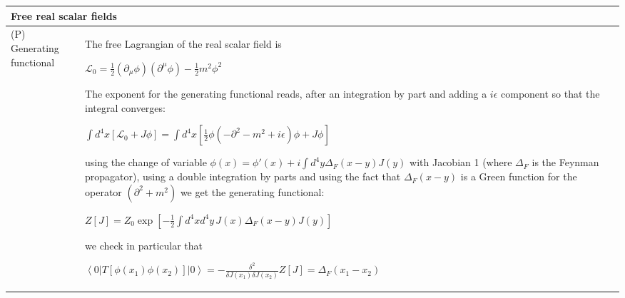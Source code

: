 \documentclass[11pt,amsmath,amssymb,latexsym]{article}
\newcommand{\toshTableBegin} 			{\begin{tabular}{|p{5cm}|p{11cm}|}}
\newcommand{\toshTableEnd} 				{\hline \end{tabular}}
\newcommand{\toshTableTitle}[1] 	{\hline \multicolumn{2}{|l|}{{\bf{#1}}}\\ \hline}
\newcommand{\toshProperty}[2]			{\hline (P) {#1} & {#2} \\}
\newcommand{\toshL}							{{\mathcal{L}}}
\newcommand{\bra}[1]{\left<{#1}\right|}
\newcommand{\ket}[1]{\left|{#1}\right>}
\begin{document}

\toshTableBegin
\toshTableTitle{Free real scalar fields}
\toshProperty{Generating functional}{The free Lagrangian of the real scalar field is 

\quad $\displaystyle \toshL_0 = \frac{1}{2}(\partial_\mu\phi)(\partial^\mu\phi) - \frac{1}{2}m^2\phi^2$

The exponent for the generating functional reads, after an integration by part and adding a $i\epsilon$ component so that the integral converges:

\quad $\displaystyle \int d^4 x [\toshL_0 + J\phi] = \int d^4 x\left[\frac{1}{2}\phi(-\partial^2- m^2 + i\epsilon)\phi + J\phi\right]$

using the change of variable $\phi(x)=\phi'(x)+ i\int d^4 y \Delta_F(x-y)J(y)$ with Jacobian 1 (where $\Delta_F$ is the Feynman propagator), using a double integration by parts and using the fact that $\Delta_F(x-y)$ is a Green function for the operator $(\partial^2+m^2)$ we get the generating functional:

\smallskip

\quad $\displaystyle Z[J] = Z_0 \exp\left[ -\frac{1}{2} \int d^4 x d^4 y \, J(x) \Delta_F(x-y)J(y)\right]$

\smallskip

we check in particular that

\quad $\displaystyle \bra{0} T[\phi(x_1)\phi(x_2)]\ket{0} = -\frac{\delta^2}{\delta J(x_1) \delta J(x_2)} Z[J] = \Delta_F(x_1-x_2)$

}
\toshTableEnd
\bigskip


\end{document}
